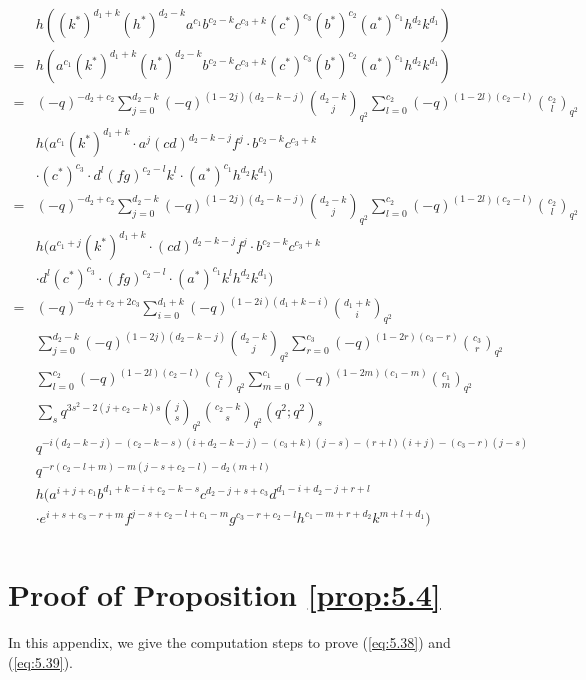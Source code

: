\documentclass[table,a4paper,reqno]{amsart}
\numberwithin{equation}{section}
\theoremstyle{definition}
\begin{document}
\begin{equation}
    \begin{split}
        &h((k^*)^{d_1+k}(h^*)^{d_2-k}a^{c_1}b^{c_2-k}c^{c_3+k}(c^*)^{c_3}(b^*)^{c_2}(a^*)^{c_1}h^{d_2}k^{d_1})\\
        =&h(a^{c_1}(k^*)^{d_1+k}(h^*)^{d_2-k}b^{c_2-k}c^{c_3+k}(c^*)^{c_3}(b^*)^{c_2}(a^*)^{c_1}h^{d_2}k^{d_1})\\
        =&(-q)^{-d_2+c_2}\sum_{j=0}^{d_2-k}(-q)^{(1-2j)(d_2-k-j)}{d_2-k\choose j}_{q^{2}}\sum_{l=0}^{c_2}(-q)^{(1-2l)(c_2-l)}{c_2\choose l}_{q^2}\\
        &h(a^{c_1}(k^*)^{d_1+k}\cdot a^j(cd)^{d_2-k-j}f^j\cdot b^{c_2-k}c^{c_3+k}\\
        &\cdot (c^*)^{c_3}\cdot d^l(fg)^{c_2-l}k^l\cdot (a^*)^{c_1} h^{d_2}k^{d_1})\\
        =&(-q)^{-d_2+c_2}\sum_{j=0}^{d_2-k}(-q)^{(1-2j)(d_2-k-j)}{d_2-k\choose j}_{q^{2}}\sum_{l=0}^{c_2}(-q)^{(1-2l)(c_2-l)}{c_2\choose l}_{q^2}\\
        &h(a^{c_1+j}(k^*)^{d_1+k}\cdot (cd)^{d_2-k-j}f^j\cdot b^{c_2-k}c^{c_3+k}\\
        &\cdot d^l(c^*)^{c_3}\cdot (fg)^{c_2-l}\cdot (a^*)^{c_1} k^lh^{d_2}k^{d_1})\\
        =&(-q)^{-d_2+c_2+2c_3}\sum_{i=0}^{d_1+k}(-q)^{(1-2i)(d_1+k-i)}{d_1+k\choose i}_{q^{2}}\\
        &\sum_{j=0}^{d_2-k}(-q)^{(1-2j)(d_2-k-j)}{d_2-k\choose j}_{q^{2}}\sum_{r=0}^{c_3}(-q)^{(1-2r)(c_3-r)}{c_3\choose r}_{q^2}\\
        &\sum_{l=0}^{c_2}(-q)^{(1-2l)(c_2-l)}{c_2\choose l}_{q^2}\sum_{m=0}^{c_1}(-q)^{(1-2m)(c_1-m)}{c_1\choose m}_{q^2}\\
        &\sum_{s}q^{3s^2-2(j+c_2-k)s}{j\choose s}_{q^2}{c_2-k\choose s}_{q^2}(q^2;q^2)_s\\
        &q^{-i(d_2-k-j)-(c_2-k-s)(i+d_2-k-j)-(c_3+k)(j-s)-(r+l)(i+j)-(c_3-r)(j-s)}\\
        &q^{-r(c_2-l+m)-m(j-s+c_2-l)-d_2(m+l)}\\
        &h(a^{i+j+c_1}b^{d_1+k-i+c_2-k-s}c^{d_2-j+s+c_3}d^{d_1-i+d_2-j+r+l}\\
        &\cdot e^{i+s+c_3-r+m}f^{j-s+c_2-l+c_1-m}g^{c_3-r+c_2-l}h^{c_1-m+r+d_2}k^{m+l+d_1})\\
    \end{split}
\end{equation}
\newpage
\section{Proof of Proposition \ref{prop:5.4}}\label{append_a}
In this appendix, we give the computation steps to prove (\ref{eq:5.38}) and (\ref{eq:5.39}).
\end{document}
